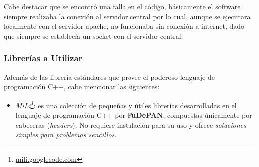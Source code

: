 \par Cabe destacar que se encontró una falla en el código, básicamente el software siempre realizaba la conexión al servidor central por lo cual, aunque se ejecutara localmente con el servidor apache, no funcionaba sin conexión a internet, dado que siempre se establecía un socket con el servidor central.

\subsubsection{Librerías a Utilizar}
Además de las librería estándares que provee el poderoso lenguaje de programación C++, cabe mencionar las siguientes:
\begin{itemize}
	\item \emph{MiLi\footnote{\url{mili.googlecode.com}}}: es una colección de pequeñas y útiles librerías desarrolladas en el 
	lenguaje de programación C++ por \textbf{FuDePAN}, compuestas únicamente por cabeceras (\emph{headers}). No requiere
	instalación para su uso y ofrece \emph{soluciones simples para problemas sencillos}.
		 

\end{itemize}
